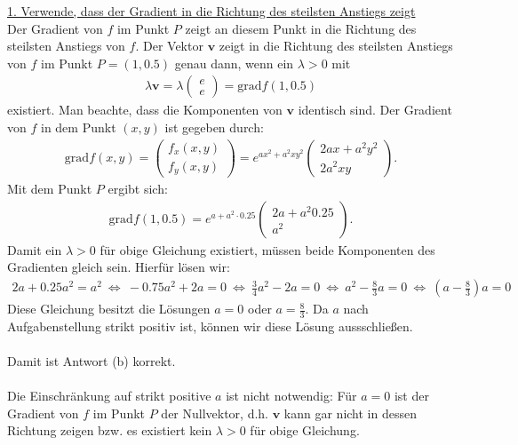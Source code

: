 \underline{1. Verwende, dass der Gradient in die Richtung des steilsten Anstiegs zeigt}\\
Der Gradient von $f$ im Punkt $P$ zeigt an diesem Punkt in die Richtung des steilsten Anstiegs von $f$.
Der Vektor $\mathbf{v}$ zeigt in die Richtung des steilsten Anstiegs von $f$ im Punkt $P = (1,0.5)$ genau dann, wenn ein $\lambda > 0 $ mit 
\begin{align*}
	\lambda\mathbf{v} 
	= \lambda 
	\begin{pmatrix}
		e \\ e
	\end{pmatrix}
	= \mathrm{grad} f(1,0.5)
\end{align*}
existiert. Man beachte, dass die Komponenten von $\mathbf{v}$ identisch sind. Der Gradient von $f$ in dem Punkt $(x,y)$ ist gegeben durch:
\begin{align*}
	\mathrm{grad} f(x,y)
	=
	\begin{pmatrix}
		f_x(x,y)\\
		f_y(x,y)
	\end{pmatrix}
	=
	e^{ax^2 +a^2 xy^2}
	\begin{pmatrix}
		2a x + a^2 y^2 \\
		2 a^2 xy
	\end{pmatrix}.
\end{align*}
Mit dem Punkt $P$ ergibt sich:
\begin{align*}
	\mathrm{grad} f(1,0.5)
	=
	e^{a+a^2\cdot 0.25}
	\begin{pmatrix}
		2a+a^2 0.25\\
		a^2
	\end{pmatrix}.
\end{align*}
Damit ein $\lambda > 0$ für obige Gleichung existiert, müssen beide Komponenten des Gradienten gleich sein. Hierfür lösen wir:
\begin{align*}
	2a + 0.25 a^2 = a^2 
	\ \Leftrightarrow \
	-0.75a^2 + 2a = 0
	\ \Leftrightarrow \
	\frac{3}{4} a^2 -2a = 0
	\ \Leftrightarrow \
	a^2 - \frac{8}{3} a = 0
	\ \Leftrightarrow \
	\left(a - \frac{8}{3}\right) a = 0
\end{align*}
Diese Gleichung besitzt die Lösungen $a= 0$ oder $a = \frac{8}{3}$. 
Da $a$ nach Aufgabenstellung strikt positiv ist, können wir diese Lösung aussschließen.\\
\\
Damit ist Antwort (b) korrekt.\\
\\
Die Einschränkung auf strikt positive $a$ ist nicht notwendig:
Für $a = 0$ ist der Gradient von $f$ im Punkt $P$ der Nullvektor, d.h. $\mathbf{v} $ kann gar nicht in dessen Richtung zeigen bzw. es existiert kein $\lambda > 0$ für obige Gleichung.


